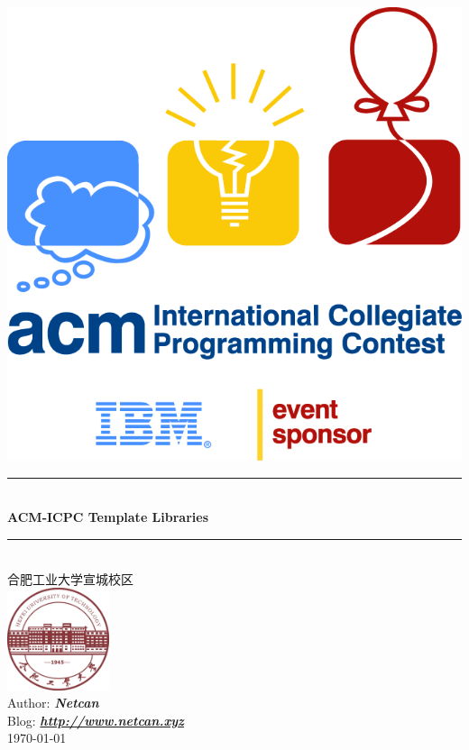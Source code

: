 \documentclass[a4paper]{ctexrep}
\newcommand{\HRule}{\rule{\linewidth}{0.5mm}} %
\begin{document}
\begin{titlepage}
\begin{center}
\includegraphics{acm_icpc_logo.png}\\[0.5cm]
\HRule\\[0.4cm]
{\huge \bfseries ACM-ICPC Template Libraries}\\[0.2cm] 
\HRule\\[1.5cm]
\textsc{\large 合肥工业大学宣城校区}\\[1cm]
\includegraphics[width=3cm, height=3cm]{hfut_logo.jpg}\\[0.5cm]
Author: \textbf{\emph{Netcan}}\\
Blog: \textbf{\emph{\url{http://www.netcan.xyz}}}\\
{\large \today}\\[2cm]
\end{center}
\end{titlepage}

\tableofcontents
\end{document}
